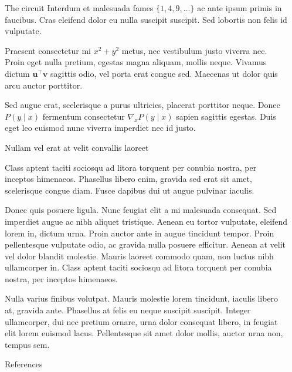 \documentclass[final]{beamer}
\newlength{\sepwidth}
\newlength{\colwidth}
\newcommand{\separatorcolumn}{\begin{column}{\sepwidth}\end{column}}
\begin{document}
\begin{frame}[t]
\begin{columns}[t]
\begin{column}{\colwidth}
\begin{block}{The circuit}
    Interdum et malesuada fames $\{1, 4, 9, \ldots\}$ ac ante ipsum primis in
    faucibus. Cras eleifend dolor eu nulla suscipit suscipit. Sed lobortis non
    felis id vulputate.


    Praesent consectetur mi $x^2 + y^2$ metus, nec vestibulum justo viverra
    nec. Proin eget nulla pretium, egestas magna aliquam, mollis neque. Vivamus
    dictum $\mathbf{u}^\intercal\mathbf{v}$ sagittis odio, vel porta erat
    congue sed. Maecenas ut dolor quis arcu auctor porttitor.


    Sed augue erat, scelerisque a purus ultricies, placerat porttitor neque.
    Donec $P(y \mid x)$ fermentum consectetur $\nabla_x P(y \mid x)$ sapien
    sagittis egestas. Duis eget leo euismod nunc viverra imperdiet nec id
    justo.

    \end{block}

    \begin{block}{Nullam vel erat at velit convallis laoreet}

    Class aptent taciti sociosqu ad litora torquent per conubia nostra, per
    inceptos himenaeos. Phasellus libero enim, gravida sed erat sit amet,
    scelerisque congue diam. Fusce dapibus dui ut augue pulvinar iaculis.

    Donec quis posuere ligula. Nunc feugiat elit a mi malesuada consequat. Sed
    imperdiet augue ac nibh aliquet tristique. Aenean eu tortor vulputate,
    eleifend lorem in, dictum urna. Proin auctor ante in augue tincidunt
    tempor. Proin pellentesque vulputate odio, ac gravida nulla posuere
    efficitur. Aenean at velit vel dolor blandit molestie. Mauris laoreet
    commodo quam, non luctus nibh ullamcorper in. Class aptent taciti sociosqu
    ad litora torquent per conubia nostra, per inceptos himenaeos.

    Nulla varius finibus volutpat. Mauris molestie lorem tincidunt, iaculis
    libero at, gravida ante. Phasellus at felis eu neque suscipit suscipit.
    Integer ullamcorper, dui nec pretium ornare, urna dolor consequat libero,
    in feugiat elit lorem euismod lacus. Pellentesque sit amet dolor mollis,
    auctor urna non, tempus sem.

    \end{block}

    \begin{block}{References}

    \nocite{*}
    \footnotesize{\printbibliography[heading = none]}

    \end{block}

\end{column}

\separatorcolumn
\end{columns}
\end{frame}
\end{document}
